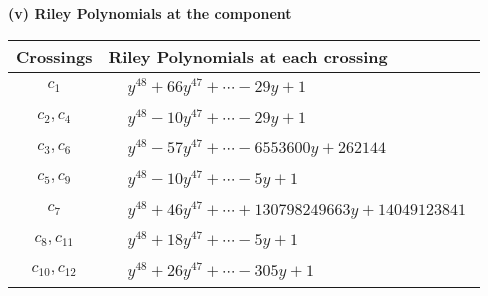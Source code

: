 \documentclass[1p]{elsarticle_modified}
\theoremstyle{definition}
\begin{document}
\flushleft \textbf{(v) Riley Polynomials at the component}\newline \\
\begin{tabular}{m{50pt}|m{274pt}}
Crossings & \hspace{64pt}Riley Polynomials at each crossing \\
\hline $$\begin{aligned}c_{1}\end{aligned}$$&$\begin{aligned}
&y^{48}+66 y^{47}+\cdots-29 y+1
\end{aligned}$\\
\hline $$\begin{aligned}c_{2},c_{4}\end{aligned}$$&$\begin{aligned}
&y^{48}-10 y^{47}+\cdots-29 y+1
\end{aligned}$\\
\hline $$\begin{aligned}c_{3},c_{6}\end{aligned}$$&$\begin{aligned}
&y^{48}-57 y^{47}+\cdots-6553600 y+262144
\end{aligned}$\\
\hline $$\begin{aligned}c_{5},c_{9}\end{aligned}$$&$\begin{aligned}
&y^{48}-10 y^{47}+\cdots-5 y+1
\end{aligned}$\\
\hline $$\begin{aligned}c_{7}\end{aligned}$$&$\begin{aligned}
&y^{48}+46 y^{47}+\cdots+130798249663 y+14049123841
\end{aligned}$\\
\hline $$\begin{aligned}c_{8},c_{11}\end{aligned}$$&$\begin{aligned}
&y^{48}+18 y^{47}+\cdots-5 y+1
\end{aligned}$\\
\hline $$\begin{aligned}c_{10},c_{12}\end{aligned}$$&$\begin{aligned}
&y^{48}+26 y^{47}+\cdots-305 y+1
\end{aligned}$\\
\hline
\end{tabular}\\~\\
\end{document}
